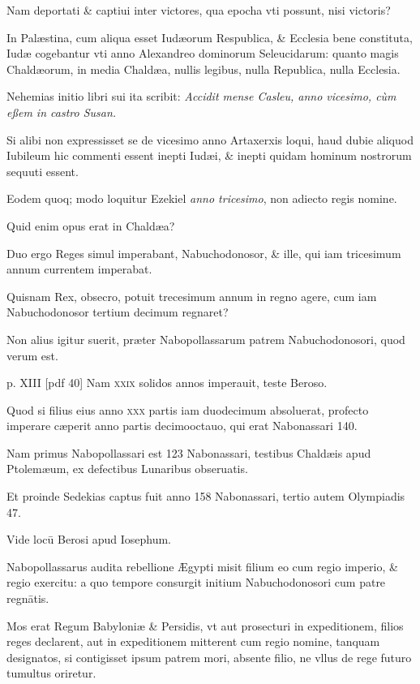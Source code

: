 \begin{parnumbers}
Nam deportati \& captiui
inter victores, qua epocha vti possunt, nisi victoris?

In Palæstina,
cum aliqua esset Iudæorum Respublica, \& Ecclesia bene constituta,
Iudæ cogebantur vti anno Alexandreo dominorum Seleucidarum:
quanto magis Chaldæorum, in media Chaldæa, nullis legibus,
nulla Republica, nulla Ecclesia.

Nehemias initio libri sui ita
scribit: \textit{Accidit mense Casleu, anno vicesimo, cùm eßem in castro Susan.}

Si alibi non expressisset se de vicesimo anno Artaxerxis loqui, haud
dubie aliquod Iubileum hic commenti essent inepti Iudæi, \& inepti
quidam hominum nostrorum sequuti essent.

Eodem quoq; modo
loquitur Ezekiel \textit{anno tricesimo}, non adiecto regis nomine.

Quid enim opus erat in Chaldæa?

Duo ergo Reges simul imperabant,
Nabuchodonosor, \& ille, qui iam tricesimum annum currentem
imperabat.

Quisnam Rex, obsecro, potuit trecesimum annum in regno
agere, cum iam Nabuchodonosor tertium decimum regnaret?

Non alius igitur suerit, præter Nabopollassarum patrem Nabuchodonosori,
quod verum est.

\clearpage
p. XIII [pdf 40]
Nam \textsc{xxix} solidos annos imperauit,
teste Beroso.

Quod si filius eius anno \textsc{xxx} partis iam duodecimum
absoluerat, profecto imperare cæperit anno partis decimooctauo,
qui erat Nabonassari 140.

Nam primus Nabopollassari est 123 Nabonassari,
testibus Chaldæis apud Ptolemæum, ex defectibus Lunaribus
obseruatis.

Et proinde Sedekias captus fuit anno 158 Nabonassari,
tertio autem Olympiadis 47.

Vide locū Berosi apud Iosephum.

Nabopollassarus audita rebellione Ægypti misit filium eo
cum regio imperio, \& regio exercitu: a quo tempore consurgit initium
Nabuchodonosori cum patre regnātis.

Mos erat Regum Babyloniæ
\& Persidis, vt aut prosecturi in expeditionem, filios reges declarent,
aut in expeditionem mitterent cum regio nomine, tanquam
designatos, si contigisset ipsum patrem mori, absente filio, ne
vllus de rege futuro tumultus oriretur.


\end{parnumbers}
